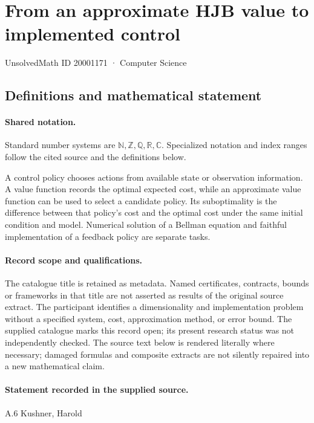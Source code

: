 \documentclass[11pt]{article}
\begin{document}
\setcounter{section}{20001170}
\section{From an approximate HJB value to implemented control}\label{20001171}
{\small\sffamily UnsolvedMath ID 20001171 · Computer Science}
\subsection{Definitions and mathematical statement}

\paragraph{Shared notation.}Standard number systems are $\mathbb N,\mathbb Z,\mathbb Q,\mathbb R,\mathbb C$. Specialized notation and index ranges follow the cited source and the definitions below.


A control policy chooses actions from available state or observation information. A value function records the optimal expected cost, while an approximate value function can be used to select a candidate policy. Its suboptimality is the difference between that policy's cost and the optimal cost under the same initial condition and model. Numerical solution of a Bellman equation and faithful implementation of a feedback policy are separate tasks.
\paragraph{Record scope and qualifications.}
The catalogue title is retained as metadata. Named certificates, contracts, bounds or frameworks in that title are not asserted as results of the original source extract.
The participant identifies a dimensionality and implementation problem without a specified system, cost, approximation method, or error bound. The supplied catalogue marks this record open; its present research status was not independently checked.
The source text below is rendered literally where necessary; damaged formulas and composite extracts are not silently repaired into a new mathematical claim.
\paragraph{Statement recorded in the supplied source.}
A.6 Kushner, Harold
\end{document}
